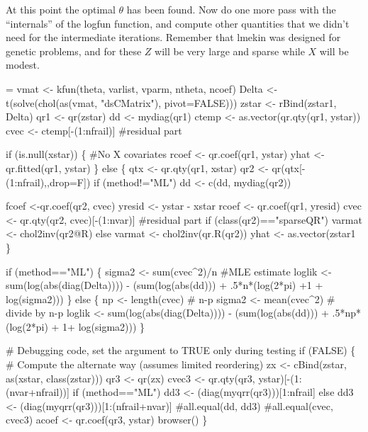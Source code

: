\documentclass{article}
\begin{document}
At this point the optimal $\theta$ has been found.
Now do one more pass with the ``internals'' of the logfun
function, and compute other quantities that we didn't need    
for the intermediate iterations.
Remember that lmekin was designed for genetic problems,
and for these $Z$ will be very large and sparse while $X$ will
be modest. 
\begin{nwchunk}
=
 vmat <-  kfun(theta, varlist, vparm, ntheta, ncoef)
 Delta <- t(solve(chol(as(vmat, "dsCMatrix"), pivot=FALSE)))
 zstar <- rBind(zstar1, Delta)
 qr1 <- qr(zstar)
 dd <- mydiag(qr1)
 ctemp <- as.vector(qr.qty(qr1, ystar))
 cvec <- ctemp[-(1:nfrail)]  #residual part
 
 if (is.null(xstar)) \{ #No X covariates
     rcoef <- qr.coef(qr1, ystar)
     yhat <- qr.fitted(qr1, ystar)
 \}
 else \{
     qtx <- qr.qty(qr1, xstar)
     qr2 <- qr(qtx[-(1:nfrail),,drop=F])
     if (method!="ML") dd <- c(dd, mydiag(qr2))
 
     fcoef <-qr.coef(qr2, cvec)
     yresid <- ystar - xstar %
     rcoef <- qr.coef(qr1, yresid)
     cvec <- qr.qty(qr2, cvec)[-(1:nvar)] #residual part
     if (class(qr2)=="sparseQR") varmat <- chol2inv(qr2@R)
     else varmat <- chol2inv(qr.R(qr2))
     yhat <- as.vector(zstar1 %
 \}
 
 if (method=="ML") \{
     sigma2 <- sum(cvec^2)/n  #MLE estimate  
     loglik <- sum(log(abs(diag(Delta)))) - 
           (sum(log(abs(dd))) + .5*n*(log(2*pi) +1 + log(sigma2)))
 \}
 else \{
     np <- length(cvec)  # n-p
     sigma2 <- mean(cvec^2)  # divide by n-p
     loglik <- sum(log(abs(diag(Delta)))) -
         (sum(log(abs(dd))) + .5*np*(log(2*pi) + 1+ log(sigma2)))
 \}
         
 # Debugging code, set the argument to TRUE only during testing
 if (FALSE) \{
     # Compute the alternate way (assumes limited reordering)
     zx <- cBind(zstar, as(xstar, class(zstar)))
     qr3 <- qr(zx)
     cvec3 <- qr.qty(qr3, ystar)[-(1:(nvar+nfrail))]
     if (method=="ML")  dd3 <- (diag(myqrr(qr3)))[1:nfrail]
     else               dd3 <- (diag(myqrr(qr3)))[1:(nfrail+nvar)]
     #all.equal(dd, dd3)
     #all.equal(cvec, cvec3)
     acoef <- qr.coef(qr3, ystar)
     browser()
 \}
\end{nwchunk}
\end{document}

